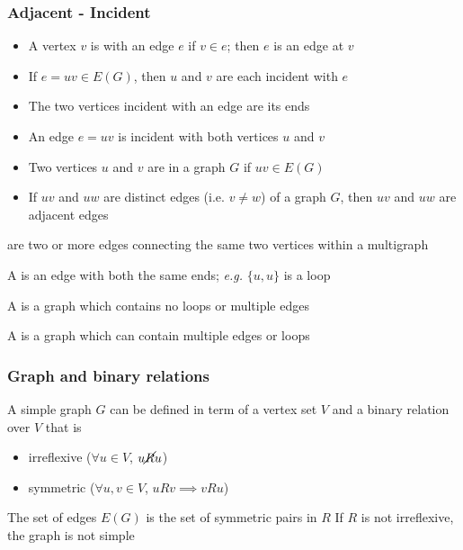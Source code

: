 \documentclass[aspectratio=43]{beamer}
\begin{document}
\begin{frame}\frametitle{Adjacent - Incident}
	\begin{definition}[Incident]
	\begin{itemize}
	\item A vertex $v$ is  with an edge $e$ if $v\in e$; then $e$ is an edge at $v$
	\item If $e=uv\in E(G)$, then $u$ and $v$ are each incident with $e$
	\item The two vertices incident with an edge are its ends
	\item An edge $e=uv$ is incident with both vertices $u$ and $v$
	\end{itemize}
	\end{definition}
	\vfill
	\begin{definition}[Adjacent]
	\begin{itemize}
	\item Two vertices $u$ and $v$ are  in a graph $G$ if $uv\in E(G)$
	\item If $uv$ and $uw$ are distinct edges (i.e. $v\not=w$) of a graph $G$, then $uv$ and $uw$ are adjacent edges
	\end{itemize}
	\end{definition}
\end{frame}


\begin{frame}
	\begin{definition}
	 are two or more edges connecting the same two vertices within a multigraph
	\end{definition}
	\vfill
	\begin{definition}[Loop]
	A  is an edge with both the same ends; \emph{e.g.} $\{u,u\}$ is a loop
	\end{definition}
	\vfill
	\begin{definition}
		A  is a graph which contains no loops or multiple edges
	\end{definition}
	\vfill
	\begin{definition}[Multigraph]
		A  is a graph which can contain multiple edges or loops
	\end{definition}
\end{frame}


\begin{frame}\frametitle{Graph and binary relations}
	A simple graph $G$ can be defined in term of a vertex set $V$ and a binary relation over $V$ that is
	\begin{itemize}
		\item irreflexive ($\forall u\in V$, $u\cancel Ru$)
		\item symmetric ($\forall u,v\in V$, $uRv\implies vRu$)
	\end{itemize}
	\vfill
	The set of edges $E(G)$ is the set of symmetric pairs in $R$
	\vfill
	If $R$ is not irreflexive, the graph is not simple
\end{frame}
\end{document}
